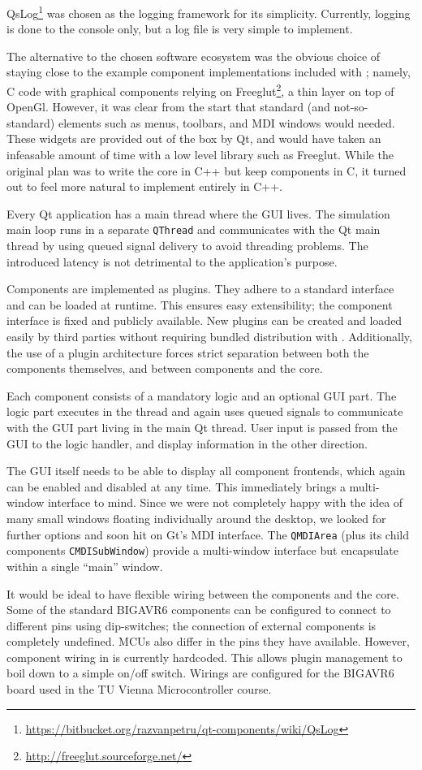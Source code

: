QsLog\footnote{\url{https://bitbucket.org/razvanpetru/qt-components/wiki/QsLog}}
was chosen as the logging framework for its simplicity. Currently, logging is done
to the console only, but a log file is very simple to implement.

The alternative to the chosen software ecosystem was the obvious choice of
staying close to the example component implementations included with \simavr;
namely, C code with graphical components relying on Freeglut\footnote{
%
\url{http://freeglut.sourceforge.net/}
%
}, a thin layer on top of OpenGl. However, it was clear from the start that
standard (and not-so-standard) elements such as menus, toolbars, and \ac{MDI}
windows would needed. These widgets are provided out of the box by Qt, and
would have taken an infeasable amount of time with a low level library such as
Freeglut. While the original plan was to write the \qsimavr core in C++ but keep
components in C, it turned out to feel more natural to implement entirely in C++.

Every Qt application has a main thread where the \ac{GUI} lives. The \simavr
simulation main loop runs in a separate \lstinline|QThread| and communicates
with the Qt main thread by using queued signal delivery to avoid threading
problems. The introduced latency is not detrimental to the application's purpose.

Components are implemented as plugins. They adhere to a standard interface and
can be loaded at runtime. This ensures easy extensibility; the component interface
is fixed and publicly available. New plugins can be created and loaded easily by
third parties without requiring bundled distribution with \qsimavr. Additionally,
the use of a plugin architecture forces strict separation between both
the components themselves, and between components and the core.

Each component consists of a mandatory logic and an optional \ac{GUI} part.
The logic part executes in the \simavr thread and again uses queued signals
to communicate with the \ac{GUI} part living in the main Qt thread. User input
is passed from the \ac{GUI} to the logic handler, and display information in the
other direction.

The \ac{GUI} itself needs to be able to display all component frontends, which
again can be enabled and disabled at any time. This immediately brings a multi-window
interface to mind. Since we were not completely happy with the idea of many
small windows floating individually around the desktop, we looked for further options
and soon hit on Gt's \ac{MDI} interface. The \lstinline|QMDIArea| (plus its child
components \lstinline|CMDISubWindow|) provide a multi-window interface but
encapsulate within a single ``main'' window.

It would be ideal to have flexible wiring between the components and the core.
Some of the standard BIGAVR6 components can be configured to connect to different
pins using dip-switches; the connection of external components is completely
undefined. \acp{MCU} also differ in the pins they have available. However,
component wiring in \qsimavr is currently hardcoded. This allows plugin management
to boil down to a simple on/off switch. Wirings are configured for the BIGAVR6
board used in the \ac{TU} Vienna Microcontroller course.
